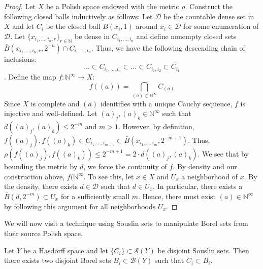 \documentclass[main.tex]{subfiles}
\begin{document}
\begin{proof}
Let $X$ be a Polish space endowed with the metric $\rho$. Construct the following closed balls inductively as follows:
Let $\mathcal{D}$ be the countable dense set in $X$ and let $C_i$ be the closed ball $\bar{B}(x_i,1)$ around $x_i \in \mathcal{D}$ for some enumeration of $\mathcal{D}$. Let $\{x_{i_1,...,i_n,r}\}_{r \in \mathbb{N}}$ be dense in $C_{i_1,...,i_n}$ and define nonempty closed sets $\bar{B}(x_{i_1,...,i_n,r},2^{-n}) \cap C_{i_1,...,i_n}$. Thus, we have the following descending chain of inclusions: $$ ... \subset C_{i_1,...,i_n} \subset ... \subset C_{i_1,i_2}\subset C_{i_1}$$.
Define the map $f:\mathbb{N}^{\infty} \rightarrow X$:
$$f((a)) = \bigcap_{(a) \in \mathbb{N}^{\infty}} C_{(a)} $$
Since $X$ is complete and $(a)$ idenitifies with a unique Cauchy sequence, $f$ is injective and well-defined. Let $(a)_j,(a)_k \in \mathbb{N}^{\infty}$ such that $d((a)_j,(a)_k) \leq 2^{-m}$ and $m > 1$. However, by definition, $f((a)_j),f((a)_k) \in C_{i_1,...,i_{m-1}} \subset \bar{B}(x_{i_1,...,i_{m}},2^{-m+1})$. Thus, $\rho(f((a)_j),f((a)_k)) \leq 2^{-m+1} = 2 \cdot d((a)_j,(a)_k)$. We see that by bounding the metric by $d$, we force the continuity of $f$. By density and our construction above, $f(\mathbb{N}^{\infty}$. To see this, let $x \in X$ and $U_x$ a neighborhood of $x$. By the density, there exists $d \in \mathcal{D}$ such that $d \in U_x$. In particular, there exists a $\bar{B}(d,2^{-m}) \subset U_x$ for a sufficiently small $m$. Hence, there must exist $(a) \in \mathbb{N}^{\infty}$ by following this argument for all neighborhoods $U_x$.
\end{proof}

We will now visit a technique using Souslin sets to manipulate Borel sets from their source Polish space. 

\begin{theorem}
Let $Y$ be a Hasdorff space and let $\{C_i\} \subset \mathcal{S}(Y)$ be disjoint Souslin sets. Then there exists two disjoint Borel sets $B_i \subset \mathcal{B}(Y)$ such that $C_i \subset B_i$.
\end{theorem}
\end{document}

